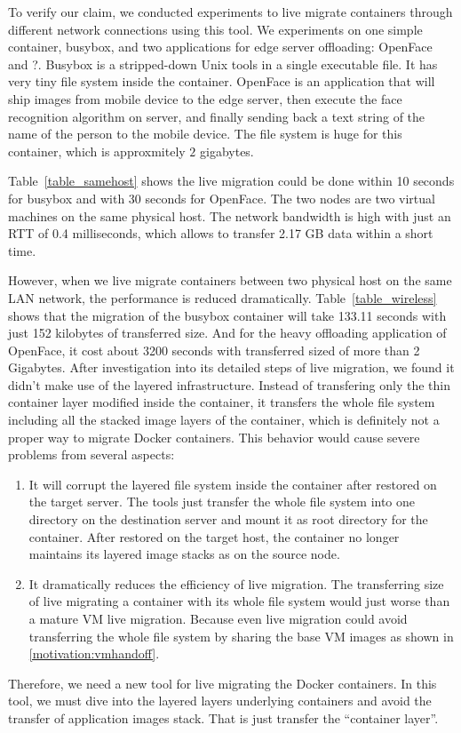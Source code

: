 To verify our claim, we conducted experiments to live migrate containers through different network connections using this tool. We experiments on one simple container, busybox, and two applications for edge server offloading: OpenFace and ?.  Busybox is a stripped-down Unix tools in a single executable file. It has very tiny file system inside the container. OpenFace\cite{openface2016} is an application that will ship images from mobile device to the edge server, then execute the face recognition algorithm on server, and finally sending back a text string of the name of the person to the mobile device. The file system is huge for this container, which is approxmitely $2$ gigabytes.

Table~\ref{table_samehost} shows the live migration could be done within 10 seconds for busybox and with 30 seconds for OpenFace. The two nodes are two virtual machines on the same physical host. The network bandwidth is high with just an RTT of 0.4 milliseconds, which allows to transfer 2.17 GB data within a short time.



However, when we live migrate containers between two physical host on the same LAN network, the performance is reduced dramatically. Table~\ref{table_wireless} shows that the migration of the busybox container will take 133.11 seconds with just 152 kilobytes of transferred size. And for the heavy offloading application of OpenFace, it cost about 3200 seconds with transferred sized of more than 2 Gigabytes. After investigation into its detailed steps of live migration, we found it didn't make use of the layered infrastructure. Instead of transfering only the thin container layer modified inside the container, it transfers the whole file system including all the stacked image layers of the container, which is definitely not a proper way to migrate Docker containers.  This behavior would cause severe problems from several aspects:
\begin{enumerate}[series = tobecont]
    \item It will corrupt the layered file system inside the container after restored  on the target server. The tools just transfer the whole file system into one directory on the destination server and mount it as root directory for the container. After restored on the target host, the container no longer maintains its layered image stacks as on the source node. 
    \item It dramatically reduces the efficiency of live migration. The transferring size of live migrating a container with its whole file system would just worse than a mature VM live migration. Because even live migration could avoid transferring the whole file system by sharing the base VM images as shown in \ref{motivation:vmhandoff}. 
\end{enumerate}

Therefore, we need a new tool for live migrating the Docker containers. In this tool, we must dive into the layered layers underlying containers and avoid the transfer of application images stack. That is just transfer the ``container layer''. 

